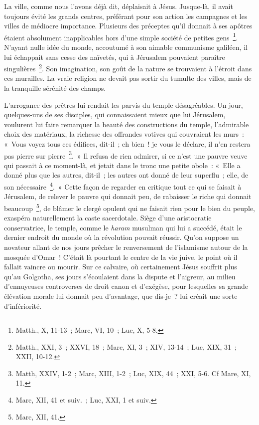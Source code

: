 \documentclass[french,twoside]{book} %
\begin{document}
La ville, comme nous l’avons déjà dit, déplaisait à Jésus. Jusque-là, il avait toujours évité les grands centres, préférant pour son action les campagnes et les villes de médiocre importance. Plusieurs des préceptes qu’il donnait à ses apôtres étaient absolument inapplicables hors d’une simple société de petites gens \footnote{Matth., X, 11-13 ; Marc, VI, 10 ; Luc, X, 5-8.}. N’ayant nulle idée du monde, accoutumé à son aimable communisme galiléen, il lui échappait sans cesse des naïvetés, qui à Jérusalem pouvaient paraître singulières \footnote{Matth., XXI, 3 ; XXVI, 18 ; Marc, XI, 3 ; XIV, 13-14 ; Luc, XIX, 31 ; XXII, 10-12.}. Son imagination, son goût de la nature se trouvaient à l’étroit dans ces murailles. La vraie religion ne devait pas sortir du tumulte des villes, mais de la tranquille sérénité des champs.\par
L’arrogance des prêtres lui rendait les parvis du temple désagréables. Un jour, quelques-uns de ses disciples, qui connaissaient mieux que lui Jérusalem, voulurent lui faire remarquer la beauté des constructions du temple, l’admirable choix des matériaux, la richesse des offrandes votives qui couvraient les murs : « Vous voyez tous ces édifices, dit-il ; eh bien ! je vous le déclare, il n’en restera pas pierre sur pierre \footnote{ Matth, XXIV, 1-2 ; Marc, XIII, 1-2 ; Luc, XIX, 44 ; XXI, 5-6. Cf Mare, XI, 11.}. » Il refusa de rien admirer, si ce n’est une pauvre veuve qui passait à ce moment-là, et jetait dans le tronc une petite obole : « Elle a donné plus que les autres, dit-il ; les autres ont donné de leur superflu ; elle, de son nécessaire \footnote{Marc, XII, 41 et suiv. ; Luc, XXI, 1 et suiv.}. » Cette façon de regarder en critique tout ce qui se faisait à Jérusalem, de relever le pauvre qui donnait peu, de rabaisser le riche qui donnait beaucoup \footnote{Marc, XII, 41.}, de blâmer le clergé opulent qui ne faisait rien pour le bien du peuple, exaspéra naturellement la caste sacerdotale. Siège d’une aristocratie conservatrice, le temple, comme le {\itshape haram} musulman qui lui a succédé, était le dernier endroit du monde où la révolution pouvait réussir. Qu’on suppose un novateur allant de nos jours prêcher le renversement de l’islamisme autour de la mosquée d’Omar ! C’était là pourtant le centre de la vie juive, le point où il fallait vaincre ou mourir. Sur ce calvaire, où certainement Jésus souffrit plus qu’au Golgotha, ses jours s’écoulaient dans la dispute et l’aigreur, au milieu d’ennuyeuses controverses de droit canon et d’exégèse, pour lesquelles sa grande élévation morale lui donnait peu d’avantage, que dis-je ? lui créait une sorte d’infériorité.\par
\end{document}
